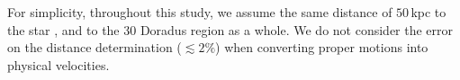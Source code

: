 \documentclass[apjl,twocolumn]{emulateapj}
\newcommand{\todo}[1]{{\large $\blacksquare$~\textbf{\color{red}[#1]}}~$\blacksquare$}
\newcommand{\kms}{{\,\mathrm{km\ s^{-1}}}}
\begin{document}

For simplicity, throughout this study, we assume the same
distance of $50$\,kpc to the star \citep[][]{pietrzynski:13}, and to
the 30 Doradus region as a whole. We do not consider the error on
the distance determination ($\lesssim2\%$) when converting proper motions into
physical velocities. %
\end{document}
